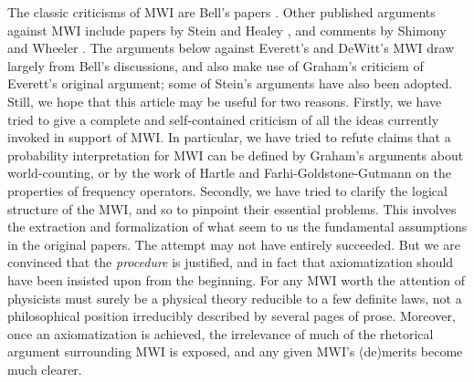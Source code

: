 \documentclass[aps,pra,12pt]{revtex4}
\begin{document}
The classic criticisms of MWI are Bell's papers \cite{bell1,bell2}.
Other published arguments against MWI include papers by
Stein \cite{stein} and Healey \cite{healey}, 
and comments by Shimony \cite{shim} and Wheeler \cite{wheel}.
The arguments below against Everett's and DeWitt's MWI 
draw largely from Bell's discussions, and also make use of 
Graham's criticism \cite{gr} of Everett's original argument;
some of Stein's arguments have also been adopted. 
Still, we hope that this article may be useful for two reasons.  
Firstly, we have tried to give a complete and self-contained criticism of 
all the ideas currently invoked in support of MWI. 
In particular, we have tried to refute claims that a probability 
interpretation for MWI can be defined by Graham's arguments about 
world-counting, or by the work of Hartle and Farhi-Goldstone-Gutmann on
the properties of frequency operators.  
Secondly, we have tried to clarify the logical structure of the MWI,
and so to pinpoint their essential problems. 
This involves the extraction and formalization of what seem to us the
fundamental assumptions in the original papers.  
The attempt may not have entirely succeeded.
But we are convinced that the {\em procedure} is justified, 
and in fact that axiomatization should have been insisted upon 
from the beginning. 
For any MWI worth the attention of physicists must surely be a
physical theory reducible to a few definite laws, not a
philosophical position irreducibly described by several pages of
prose. Moreover, once an axiomatization is achieved,
the irrelevance of much of the rhetorical argument surrounding MWI is exposed, 
and any given MWI's (de)merits become much clearer. 
\end{document}
